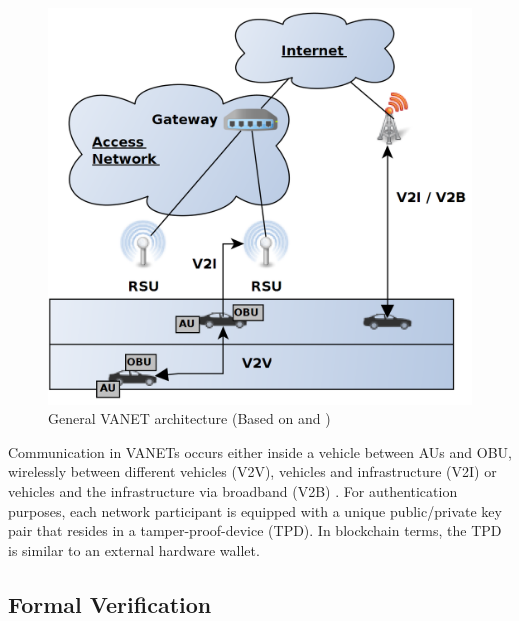 \documentclass{llncs}
\begin{document}
{			\begin{figure}[ht]
				\centering
				\includegraphics[scale=0.2]{Figures/Vanets.png}
				\caption{General VANET architecture (Based on \protect\cite{baldessari2007car} and \cite{leiding2016self})}
				\label{fig:vanets}
			\end{figure}			
			Communication in VANETs occurs either inside a vehicle between AUs and OBU, wirelessly between different vehicles (V2V), vehicles and infrastructure (V2I) or vehicles and the infrastructure via broadband (V2B) \cite{faezipour2012progress}. For authentication purposes, each network participant is equipped with a unique public/private key pair that resides in a tamper-proof-device (TPD). In blockchain terms, the TPD is similar to an external hardware wallet.

		
		\subsection{Formal Verification}
			\label{ss:formal-verification}

}
\end{document}
